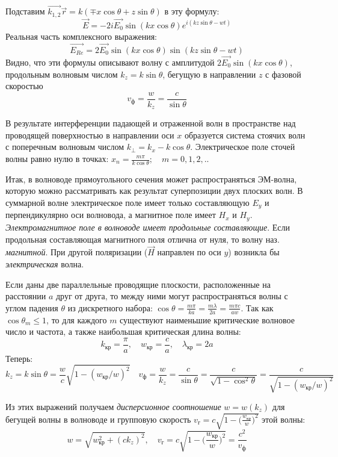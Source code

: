\documentclass[a4paper,12pt]{article}
\begin{document}
Подставим $\vec{k_{1,2}}\vec{r}=k(\mp x\cos{\theta} + z\sin{\theta})$ в эту формулу:
$$
\vec{E} = -2i\vec{E_0}\sin{(kx\cos{\theta})}e^{i(kz\sin{\theta}-wt)}
$$
Реальная часть комплексного выражения:
$$
\vec{E_{Re}} = 2\vec{E_0}\sin{(kx\cos{\theta})}\sin{(kz\sin{\theta}-wt)}
$$
Видно, что эти формулы описывают волну с амплитудой $2\vec{E_0}\sin{(kx\cos{\theta})}$, продольным волновым числом $k_z = k\sin{\theta}$, бегущую в направлении $z$ с фазовой скоростью 
$$
v_\text{ф} = \frac{w}{k_z}=\frac{c}{\sin{\theta}}
$$

В результате интерференции падающей и отраженной волн в пространстве над проводящей поверхностью в направлении оси $x$ образуется система стоячих волн с поперечным волновым числом $k_\perp=k_x-k\cos{\theta}$. Электрическое поле сточей волны равно нулю в точках: $x_n = \frac{m\pi}{k\cos{\theta}};\quad m=0,1,2,..$

Итак, в волноводе прямоугольного сечения может распространяться ЭМ-волна, которую можно рассматривать как результат суперпозиции двух плоских волн. В суммарной волне электрическое поле имеет только составляющую $E_y$ и перпендикулярно оси волновода, а магнитное поле имеет $H_x$ и $H_y$. \textit{Электромагнитное поле в волноводе имеет продольные составляющие}. Если продольная составляющая магнитного поля отлична от нуля, то волну наз. \textit{магнитной}. При другой поляризации ($\vec{H}$ направлен по оси $y$) возникла бы \textit{электрическая} волна.

Если даны две параллельные проводящие плоскости, расположенные на расстоянии $a$ друг от друга, то между ними могут распространяться волны с углом падения $\theta$ из дискретного набора: $\cos{\theta}=\frac{m\pi}{ka}=\frac{m\lambda}{2a}=\frac{m\pi c}{aw}$. Так как $\cos{\theta_m} \leq 1$, то для каждого $m$ существуют наименьшие критические волновое число и частота, а также наибольшая критическая длина волны: 
$$
k_\text{кр}=\frac{\pi}{a}, \quad w_\text{кр} = \frac{c}{a}, \quad \lambda_\text{кр} = 2a
$$
Теперь:
$$
k_z=k\sin{\theta} = \frac{w}{c}\sqrt{1-(w_\text{кр}/w)^2} \quad
v_\text{ф}=\frac{w}{k_z}=\frac{c}{\sin{\theta}}=\frac{c}{\sqrt{1-\cos^2{\theta}}} = \frac{c}{\sqrt{1-(w_\text{кр}/w)^2}}
$$

Из этих выражений получаем \textit{дисперсионное соотношение} $w=w(k_z)$ для бегущей волны в волноводе и групповую скорость $v_{\text{г}}=c\sqrt{1-\Big(\frac{w_\text{кр}}{w}\Big)^2}$ этой волны:
$$
w=\sqrt{w_\text{кр}^2+(ck_z)^2}, \quad v_\text{г} = c\sqrt{1-\Big(\frac{w_\text{кр}}{w}\Big)^2} = \frac{c^2}{v_\text{ф}}
$$
\end{document}
